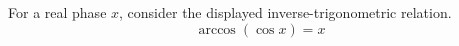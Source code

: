 \documentclass{article}
\begin{document}
For a real phase $x$, consider the displayed inverse-trigonometric relation.
\begin{equation}
  \arccos(\cos x)=x
\end{equation}
\end{document}
